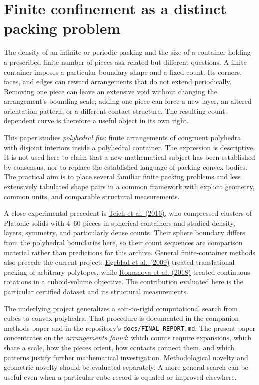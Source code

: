 \documentclass[11pt,a4paper]{article}
\begin{document}
\section{Finite confinement as a distinct packing problem}

The density of an infinite or periodic packing and the size of a container holding a prescribed finite number of pieces ask related but different questions. A finite container imposes a particular boundary shape and a fixed count. Its corners, faces, and edges can reward arrangements that do not extend periodically. Removing one piece can leave an extensive void without changing the arrangement's bounding scale; adding one piece can force a new layer, an altered orientation pattern, or a different contact structure. The resulting count-dependent curve is therefore a useful object in its own right.

This paper studies \emph{polyhedral fits}: finite arrangements of congruent polyhedra with disjoint interiors inside a polyhedral container. The expression is descriptive. It is not used here to claim that a new mathematical subject has been established by consensus, nor to replace the established language of packing convex bodies. The practical aim is to place several familiar finite packing problems and less extensively tabulated shape pairs in a common framework with explicit geometry, common units, and comparable structural measurements.

A close experimental precedent is \href{https://doi.org/10.1073/pnas.1524875113}{Teich et al. (2016)}, who compressed clusters of Platonic solids with 4--60 pieces in spherical containers and studied density, layers, symmetry, and particularly dense counts. Their sphere boundary differs from the polyhedral boundaries here, so their count sequences are comparison material rather than predictions for this archive. General finite-container methods also precede the current project: \href{https://doi.org/10.1016/j.comgeo.2008.06.003}{Egeblad et al. (2009)} treated translational packing of arbitrary polytopes, while \href{https://doi.org/10.1016/j.ejor.2018.01.025}{Romanova et al. (2018)} treated continuous rotations in a cuboid-volume objective. The contribution evaluated here is the particular certified dataset and its structural measurements.

The underlying project generalizes a soft-to-rigid computational search from cubes to convex polyhedra. That procedure is documented in the companion methods paper and in the repository's \nolinkurl{docs/FINAL_REPORT.md}. The present paper concentrates on the \emph{arrangements found}: which counts require expansions, which share a scale, how the pieces orient, how contacts connect them, and which patterns justify further mathematical investigation. Methodological novelty and geometric novelty should be evaluated separately. A more general search can be useful even when a particular cube record is equaled or improved elsewhere.
\end{document}
